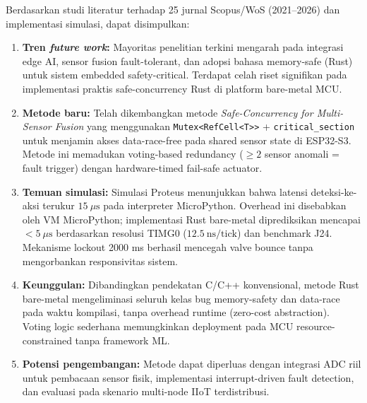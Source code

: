 \documentclass[12pt,a4paper]{article}
\begin{document}
Berdasarkan studi literatur terhadap 25 jurnal Scopus/WoS (2021--2026) dan implementasi simulasi, dapat disimpulkan:

\begin{enumerate}
  \item \textbf{Tren \textit{future work}:} Mayoritas penelitian terkini mengarah pada integrasi edge AI, sensor fusion fault-tolerant, dan adopsi bahasa memory-safe (Rust) untuk sistem embedded safety-critical. Terdapat celah riset signifikan pada implementasi praktis safe-concurrency Rust di platform bare-metal MCU.

  \item \textbf{Metode baru:} Telah dikembangkan metode \textit{Safe-Concurrency for Multi-Sensor Fusion} yang menggunakan \texttt{Mutex<RefCell<T>{}>} + \texttt{critical\_section} untuk menjamin akses data-race-free pada shared sensor state di ESP32-S3. Metode ini memadukan voting-based redundancy ($\geq 2$ sensor anomali = fault trigger) dengan hardware-timed fail-safe actuator.

  \item \textbf{Temuan simulasi:} Simulasi Proteus menunjukkan bahwa latensi deteksi-ke-aksi terukur $15\ \mu\text{s}$ pada interpreter MicroPython. Overhead ini disebabkan oleh VM MicroPython; implementasi Rust bare-metal diprediksikan mencapai $<5\ \mu\text{s}$ berdasarkan resolusi TIMG0 ($12.5\ \text{ns/tick}$) dan benchmark J24. Mekanisme lockout 2000 ms berhasil mencegah valve bounce tanpa mengorbankan responsivitas sistem.

  \item \textbf{Keunggulan:} Dibandingkan pendekatan C/C++ konvensional, metode Rust bare-metal mengeliminasi seluruh kelas bug memory-safety dan data-race pada waktu kompilasi, tanpa overhead runtime (zero-cost abstraction). Voting logic sederhana memungkinkan deployment pada MCU resource-constrained tanpa framework ML.

  \item \textbf{Potensi pengembangan:} Metode dapat diperluas dengan integrasi ADC riil untuk pembacaan sensor fisik, implementasi interrupt-driven fault detection, dan evaluasi pada skenario multi-node IIoT terdistribusi.
\end{enumerate}


\newpage
\end{document}
